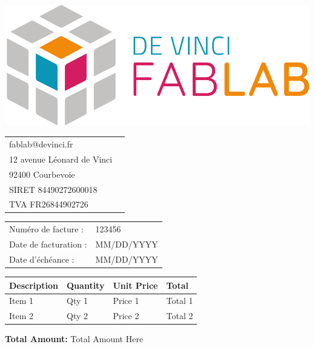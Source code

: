 \documentclass[12pt,a4paper]{article}
\begin{document}
\begin{minipage}{0.5\textwidth}
\includegraphics[width=0.5\linewidth]{../assets/logo_fablab.png}

\vspace{0.5cm}

\begin{tabular}{ll}
fablab@devinci.fr \\
12 avenue Léonard de Vinci \\
92400 Courbevoie \\
SIRET 84490272600018 \\
TVA  FR26844902726 \\
\end{tabular}
\end{minipage}
\begin{minipage}{0.5\textwidth}
\begin{flushright}
\begin{tabular}{ll}
Numéro de facture : & 123456 \\
Date de facturation : & MM/DD/YYYY \\
Date d'échéance : & MM/DD/YYYY \\
\end{tabular}
\end{flushright}
\end{minipage}


\begin{tabularx}{0.9\textwidth}{|X|X|X|X|} 
\hline
Description & Quantity & Unit Price & Total \\
\hline
Item 1 & Qty 1 & Price 1 & Total 1 \\
Item 2 & Qty 2 & Price 2 & Total 2 \\
\hline
\end{tabularx}

\begin{flushright}
\textbf{Total Amount: } Total Amount Here \\
\end{flushright}
    
\end{document}
